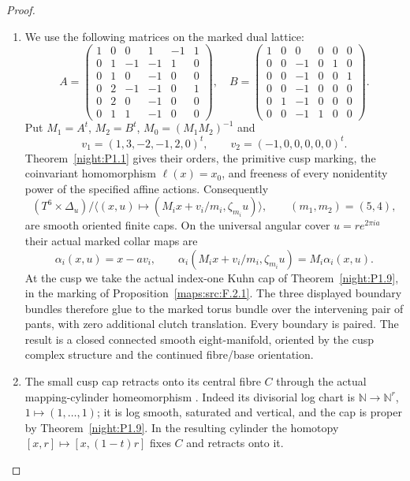 \documentclass[11pt,a4paper]{article}
\theoremstyle{definition}
\begin{document}
\begin{proof}
\begin{enumerate}[label=\arabic*.]
\item We use the following matrices on the marked dual lattice:
\[
A=\begin{pmatrix}
1&0&0&1&-1&1\\0&1&-1&-1&1&0\\0&1&0&-1&0&0\\
0&2&-1&-1&0&1\\0&2&0&-1&0&0\\0&1&1&-1&0&0
\end{pmatrix},\quad
B=\begin{pmatrix}
1&0&0&0&0&0\\0&0&-1&0&1&0\\0&0&-1&0&0&1\\
0&0&-1&0&0&0\\0&1&-1&0&0&0\\0&0&-1&1&0&0
\end{pmatrix}.
\]
Put $M_1=A^t$, $M_2=B^t$, $M_0=(M_1M_2)^{-1}$ and
\[
 v_1=(1,3,-2,-1,2,0)^t,\qquad v_2=(-1,0,0,0,0,0)^t.
\]
Theorem~\ref{night:P1.1} gives their orders, the primitive cusp
marking, the coinvariant homomorphism $\ell(x)=x_0$, and freeness of
every nonidentity power of the specified affine actions. Consequently
\[
 (T^6\times\Delta_u)/
 \langle(x,u)\mapsto(M_ix+v_i/m_i,\zeta_{m_i}u)\rangle,
 \qquad (m_1,m_2)=(5,4),
\]
are smooth oriented finite caps. On the universal angular cover
$u=r e^{2\pi ia}$ their actual marked collar maps are
\[
 \alpha_i(x,u)=x-av_i,
 \qquad
 \alpha_i(M_ix+v_i/m_i,\zeta_{m_i}u)=M_i\alpha_i(x,u).
\]
At the cusp we take the actual index-one Kuhn cap of
Theorem~\ref{night:P1.9}, in the marking of
Proposition~\ref{maps:src:F.2.1}. The three displayed boundary bundles
therefore glue to the marked torus bundle over the intervening pair
of pants, with zero additional clutch translation. Every boundary
is paired. The result is a closed connected smooth eight-manifold,
oriented by the cusp complex structure and the continued fibre/base
orientation.

\item The small cusp cap retracts onto its central fibre $C$ through
the actual mapping-cylinder homeomorphism
\cite[Theorem 4.1.1 and Lemmas 4.1.2--4.1.3, pp.~480--482]{ffAchingerOgus20}.
Indeed its divisorial log chart is
$\mathbb N\to\mathbb N^r$, $1\mapsto(1,\ldots,1)$; it is log smooth,
saturated and vertical, and the cap is proper by
Theorem~\ref{night:P1.9}. In the resulting cylinder the homotopy
$[x,r]\mapsto[x,(1-t)r]$ fixes $C$ and retracts onto it.


\end{enumerate}
\end{proof}
\end{document}
